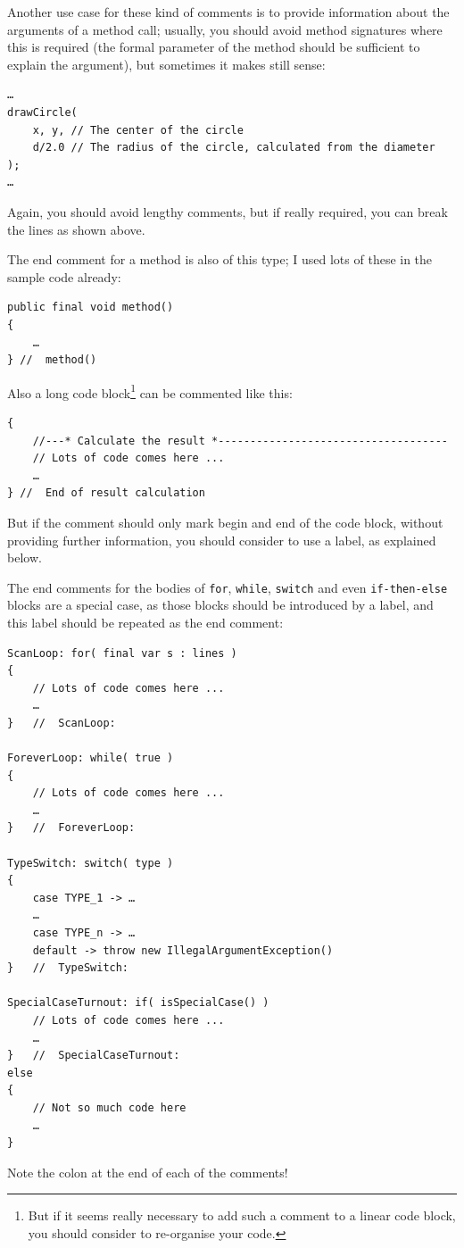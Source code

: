 \documentclass[11pt,a4paper, titlepage, parskip=half, headsepline, footsepline, cleardoublepage=current, headheight=1cm]{scrbook}
\begin{document}
Another use case for these kind of comments is to provide information about the arguments of a method call; usually, you should avoid method signatures where this is required (the formal parameter of the method should be sufficient to explain the argument), but sometimes it makes still sense:
\begin{lstlisting}
…
drawCircle(
    x, y, // The center of the circle
    d/2.0 // The radius of the circle, calculated from the diameter
);
…
\end{lstlisting}
Again, you should avoid lengthy comments, but if really required, you can break the lines as shown above.

The end comment for a method is also of this type; I used lots of these in the sample code already:
\begin{lstlisting}
public final void method()
{
    …
} //  method()
\end{lstlisting}

Also a long code block\footnote{But if it seems really necessary to add such a comment to a linear code block, you should consider to re-organise your code.} can be commented like this:
\begin{lstlisting}
{
    //---* Calculate the result *------------------------------------
    // Lots of code comes here ...
    …
} //  End of result calculation
\end{lstlisting}

But if the comment should only mark begin and end of the code block, without providing further information, you should consider to use a label, as explained below.

The end comments for the bodies of \lstinline|for|, \lstinline|while|, \lstinline|switch| and even \lstinline|if-then-else| blocks are a special case, as those blocks should be introduced by a label, and this label should be repeated as the end comment:
\begin{lstlisting}
ScanLoop: for( final var s : lines )
{
    // Lots of code comes here ...
    …
}   //  ScanLoop:

ForeverLoop: while( true )
{
    // Lots of code comes here ...
    …
}   //  ForeverLoop:

TypeSwitch: switch( type )
{
    case TYPE_1 -> …
    …
    case TYPE_n -> …
    default -> throw new IllegalArgumentException()
}   //  TypeSwitch:

SpecialCaseTurnout: if( isSpecialCase() )
    // Lots of code comes here ...
    …
}   //  SpecialCaseTurnout:
else
{
    // Not so much code here
    …
}    
\end{lstlisting}
Note the colon at the end of each of the comments!
\end{document}

